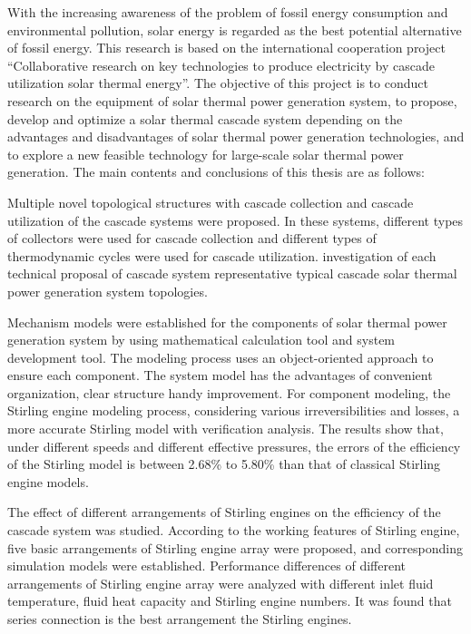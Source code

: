 \enabstract
{
With the increasing awareness of the problem of fossil energy consumption and environmental pollution, solar energy is regarded as the best potential alternative of fossil energy. This research is based on the international cooperation project ``Collaborative research on key technologies to produce electricity by cascade utilization solar thermal energy''. The objective of this project is to conduct research on the equipment of solar thermal power generation system, to propose, develop and optimize a solar thermal cascade system depending on the advantages and disadvantages of solar thermal power generation technologies, and to explore a new feasible technology for large-scale solar thermal power generation. The main contents and conclusions of this thesis are as follows:

Multiple novel topological structures with cascade collection and cascade utilization of the cascade systems were proposed. In these systems, different types of collectors were used for cascade collection and different types of thermodynamic cycles were used for cascade utilization.  investigation of each technical proposal of cascade system representative typical cascade solar thermal power generation system topologies.

Mechanism models were established for the components of solar thermal power generation system by using mathematical calculation tool and system development tool. The modeling process uses an object-oriented approach to ensure  each component. The system model has the advantages of convenient organization, clear structure handy improvement. For component modeling, the Stirling engine modeling process, considering various irreversibilities and losses,  a more accurate Stirling model with verification analysis. The results show that, under different speeds and different effective pressures, the errors of the efficiency of the  Stirling model is between 2.68\% to 5.80\%  than that of classical Stirling engine models.

The effect of different arrangements of Stirling engines on the efficiency of the cascade system was studied. 
According to the working features of Stirling engine, five basic arrangements of Stirling engine array were proposed, and corresponding simulation models were established.
Performance differences of different arrangements of Stirling engine array were analyzed with different inlet fluid temperature, fluid heat capacity and Stirling engine numbers.
It was found that series connection is the best arrangement  the Stirling engines.

}

